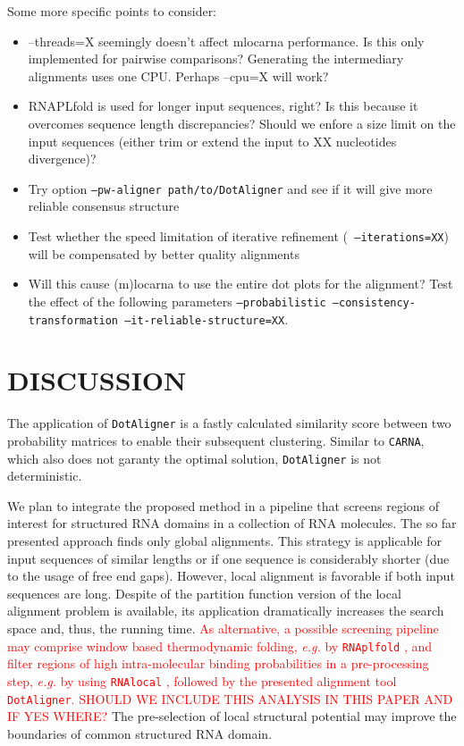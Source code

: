 \documentclass[a4paper,twoside]{article}
\newcommand\dotaligner{\texttt{DotAligner}}
\newcommand\rnaplfold{\texttt{RNAplfold}}
\newcommand\carna{\texttt{CARNA}}
\newcommand\rnalocal{\texttt{RNAlocal}}
\newcommand\eg{\textit{e.g.}}
\newcommand{\RED}[1]{\textcolor{red}{#1}}
\begin{document}
Some more specific points to consider: 
\begin{itemize}
\item --threads=X seemingly doesn't affect mlocarna performance. Is this only implemented for pairwise comparisons? 
Generating the intermediary alignments uses one CPU. Perhaps --cpu=X will work? 
\item RNAPLfold is used for longer input sequences, right? Is this because it overcomes sequence length discrepancies? 
Should we enfore a size limit on the input sequences (either trim or extend the input to XX nucleotides divergence)?
\item Try option \texttt{--pw-aligner path/to/DotAligner} and see if it will give more reliable consensus structure
\item Test whether the speed limitation of iterative refinement (\texttt{ --iterations=XX}) will be compensated by 
better quality alignments
\item Will this cause (m)locarna to use the entire dot plots for the alignment? Test the effect of the following 
parameters \texttt{--probabilistic --consistency-transformation --it-reliable-structure=XX}. 
\end{itemize} 


\section{\uppercase{Discussion}}

\noindent The application of \dotaligner{} is a fastly
calculated similarity score between two probability matrices to enable their
subsequent clustering.  Similar to \carna{}, which also does not garanty the
optimal solution, \dotaligner{} is not deterministic.

We plan to integrate the proposed method in a pipeline that screens regions of
interest for structured RNA domains in a collection of RNA molecules.  The so
far presented approach finds only global alignments. This strategy is
applicable for input sequences of similar lengths or if one sequence is
considerably shorter (due to the usage of free end gaps). However, local
alignment is favorable if both input sequences are long. Despite of the
partition function version of the local alignment problem is available, its
application dramatically increases the search space and, thus, the running
time. \RED{As alternative, a possible screening pipeline may comprise window
based thermodynamic folding, \eg{} by \rnaplfold{}
\cite{Bernhart:Hofacker:Stadler:Local_RNA_base:2006}, and filter regions of
high intra-molecular binding probabilities in a pre-processing step, \eg{} by
using \rnalocal{} \cite{Dotu19908358}, followed by the presented alignment tool
\dotaligner. SHOULD WE INCLUDE THIS ANALYSIS IN THIS PAPER AND IF YES WHERE?}
The pre-selection of local structural potential may improve the boundaries of
common structured RNA domain. 
\end{document}
